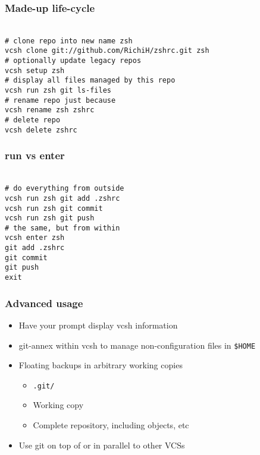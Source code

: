\documentclass[t]{beamer}
\begin{document}
\begin{frame}
	\frametitle{Made-up life-cycle}
	\texttt{ \\
		\# clone repo into new name zsh \\
		vcsh clone git://github.com/RichiH/zshrc.git zsh \\
		\# optionally update legacy repos \\
		vcsh setup zsh \\
		\# display all files managed by this repo \\
		vcsh run zsh git ls-files \\
		\# rename repo just because \\
		vcsh rename zsh zshrc \\
		\# delete repo \\
		vcsh delete zshrc
	}
\end{frame}

\begin{frame}
	\frametitle{run vs enter}
	\texttt{ \\
		\# do everything from outside \\
		vcsh run zsh git add .zshrc \\
		vcsh run zsh git commit \\
		vcsh run zsh git push \\
		\# the same, but from within\\
		vcsh enter zsh \\
		git add .zshrc \\
		git commit \\
		git push \\
		exit
	}
\end{frame}

\begin{frame}
	\frametitle{Advanced usage}
	\begin{itemize}
		\item Have your prompt display vcsh information
		\item git-annex within vcsh to manage non-configuration files in \texttt{\$HOME}
		\item Floating backups in arbitrary working copies
		\begin{itemize}
			\item \texttt{.git/}
			\item Working copy
			\item Complete repository, including objects, etc
		\end{itemize}
		\item Use git on top of or in parallel to other VCSs
	\end{itemize}
\end{frame}
\end{document}
